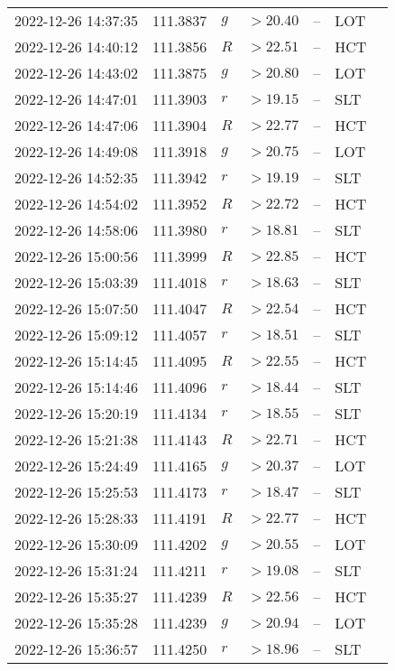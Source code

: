 \documentclass{nature_plusfigure}
\begin{document}
\begin{supplement}
\begin{center}
\begin{longtable}{lllllll}
2022-12-26 14:37:35 & 111.3837 & $g$ & $>20.40$ & -- & LOT &  \\ 
2022-12-26 14:40:12 & 111.3856 & $R$ & $>22.51$ & -- & HCT &  \\ 
2022-12-26 14:43:02 & 111.3875 & $g$ & $>20.80$ & -- & LOT &  \\ 
2022-12-26 14:47:01 & 111.3903 & $r$ & $>19.15$ & -- & SLT &  \\ 
2022-12-26 14:47:06 & 111.3904 & $R$ & $>22.77$ & -- & HCT &  \\ 
2022-12-26 14:49:08 & 111.3918 & $g$ & $>20.75$ & -- & LOT &  \\ 
2022-12-26 14:52:35 & 111.3942 & $r$ & $>19.19$ & -- & SLT &  \\ 
2022-12-26 14:54:02 & 111.3952 & $R$ & $>22.72$ & -- & HCT &  \\ 
2022-12-26 14:58:06 & 111.3980 & $r$ & $>18.81$ & -- & SLT &  \\ 
2022-12-26 15:00:56 & 111.3999 & $R$ & $>22.85$ & -- & HCT &  \\ 
2022-12-26 15:03:39 & 111.4018 & $r$ & $>18.63$ & -- & SLT &  \\ 
2022-12-26 15:07:50 & 111.4047 & $R$ & $>22.54$ & -- & HCT &  \\ 
2022-12-26 15:09:12 & 111.4057 & $r$ & $>18.51$ & -- & SLT &  \\ 
2022-12-26 15:14:45 & 111.4095 & $R$ & $>22.55$ & -- & HCT &  \\ 
2022-12-26 15:14:46 & 111.4096 & $r$ & $>18.44$ & -- & SLT &  \\ 
2022-12-26 15:20:19 & 111.4134 & $r$ & $>18.55$ & -- & SLT &  \\ 
2022-12-26 15:21:38 & 111.4143 & $R$ & $>22.71$ & -- & HCT &  \\ 
2022-12-26 15:24:49 & 111.4165 & $g$ & $>20.37$ & -- & LOT &  \\ 
2022-12-26 15:25:53 & 111.4173 & $r$ & $>18.47$ & -- & SLT &  \\ 
2022-12-26 15:28:33 & 111.4191 & $R$ & $>22.77$ & -- & HCT &  \\ 
2022-12-26 15:30:09 & 111.4202 & $g$ & $>20.55$ & -- & LOT &  \\ 
2022-12-26 15:31:24 & 111.4211 & $r$ & $>19.08$ & -- & SLT &  \\ 
2022-12-26 15:35:27 & 111.4239 & $R$ & $>22.56$ & -- & HCT &  \\ 
2022-12-26 15:35:28 & 111.4239 & $g$ & $>20.94$ & -- & LOT &  \\ 
2022-12-26 15:36:57 & 111.4250 & $r$ & $>18.96$ & -- & SLT &  \\ 

\end{longtable}
\end{center}
\end{supplement}
\end{document}
